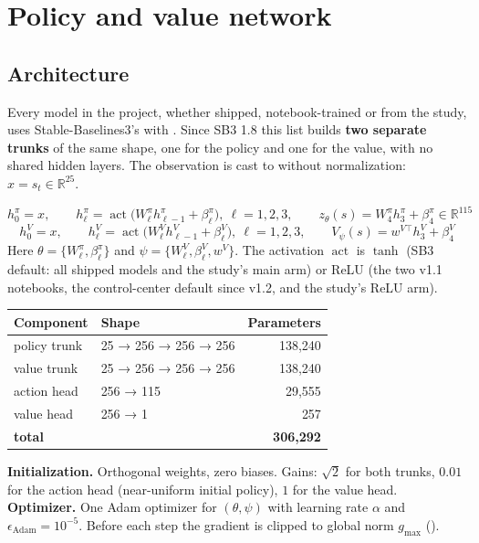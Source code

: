 \section{Policy and value network}\label{old:3}

\subsection{Architecture}\label{old:3.1}

Every model in the project, whether shipped, notebook-trained or from the study, uses Stable-Baselines3's  with . Since SB3 1.8 this list builds \textbf{two separate trunks} of the same shape, one for the policy and one for the value, with no shared hidden layers. The observation is cast to  without normalization: $x = s_t \in \mathbb{R}^{25}$.

\[
h^{\pi}_0 = x, \qquad h^{\pi}_\ell = \operatorname{act}\!\big(W^{\pi}_\ell h^{\pi}_{\ell-1} + \beta^{\pi}_\ell\big),\ \ell = 1,2,3, \qquad z_\theta(s) = W^{\pi}_4 h^{\pi}_3 + \beta^{\pi}_4 \in \mathbb{R}^{115}
\]
\[
h^{V}_0 = x, \qquad h^{V}_\ell = \operatorname{act}\!\big(W^{V}_\ell h^{V}_{\ell-1} + \beta^{V}_\ell\big),\ \ell = 1,2,3, \qquad V_\psi(s) = w^{V\top} h^{V}_3 + \beta^{V}_4
\]
Here $\theta = \{W^\pi_\ell, \beta^\pi_\ell\}$ and $\psi = \{W^V_\ell, \beta^V_\ell, w^V\}$. The activation $\operatorname{act}$ is $\tanh$ (SB3 default: all shipped models and the study's main arm) or ReLU (the two v1.1 notebooks, the control-center default since v1.2, and the study's ReLU arm).

{\small
\begin{longtable}{@{}llr@{}}
\toprule
\textbf{Component} & \textbf{Shape} & \textbf{Parameters} \\
\midrule
\endhead
policy trunk & 25 → 256 → 256 → 256 & 138,240 \\
value trunk & 25 → 256 → 256 → 256 & 138,240 \\
action head & 256 → 115 & 29,555 \\
value head & 256 → 1 & 257 \\
\textbf{total} &  & \textbf{306,292} \\
\bottomrule
\end{longtable}\addtocounter{table}{-1}
}

\textbf{Initialization.} Orthogonal weights, zero biases. Gains: $\sqrt 2$ for both trunks, $0.01$ for the action head (near-uniform initial policy), $1$ for the value head. \textbf{Optimizer.} One Adam optimizer for $(\theta, \psi)$ with learning rate $\alpha$ and $\epsilon_{\text{Adam}} = 10^{-5}$. Before each step the gradient is clipped to global norm $g_{\max}$ ().

